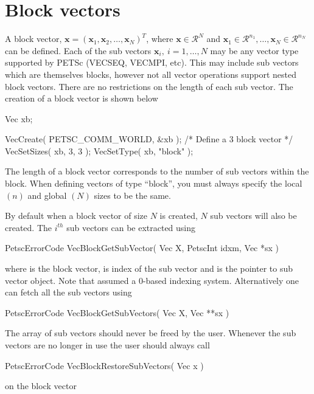 \documentclass[10pt,a4paper]{amsart}
\renewcommand{\v}[1]{\boldsymbol{#1}}		%
\newcommand{\code}[1]{{\fontfamily{txtt}\selectfont {#1}}}
\begin{document}
\section{Block vectors}
	A block vector, $\v x = ( \v x_1, \v x_2, \dots, \v x_{N} )^T$, where $\v x \in \mathcal R^{N}$ and $\v x_1 \in \mathcal R^{n_1}, \dots , \v x_{N} \in \mathcal R^{n_N}$ can be defined. Each of the sub vectors $\v x_{i}, \medspace i=1,\dots, N$ may be any vector type supported by PETSc (VECSEQ, VECMPI, etc). This may include sub vectors which are themselves blocks, however not all vector operations support nested block vectors. There are no restrictions on the length of each sub vector. The creation of a block vector is shown below
\begin{verbatimtab}[4]
	Vec xb;
	
	VecCreate( PETSC_COMM_WORLD, &xb );
	/* Define a 3 block vector */
	VecSetSizes( xb, 3, 3 );
	VecSetType( xb, "block" );
\end{verbatimtab}
The length of a block vector corresponds to the number of sub vectors within the block.
When defining vectors of type ``block'', you must always specify the local $(n)$ and global $(N)$ sizes to be the same.  

By default when a block vector of size $N$ is created, $N$ sub vectors will also be created. The $i^{th}$ sub vectors can be extracted using
\begin{verbatimtab}[4]
	PetscErrorCode VecBlockGetSubVector( Vec X, PetscInt idxm, Vec *sx )
\end{verbatimtab}
where \code{X} is the block vector, \code{idxm} is index of the sub vector and \code{*sx} is the pointer to sub vector object. Note that \code{idxm} assumed a 0-based indexing system. Alternatively one can fetch all the sub vectors using 
\begin{verbatimtab}[4]
	PetscErrorCode VecBlockGetSubVectors( Vec X, Vec **sx )
\end{verbatimtab}
The array of sub vectors \code{*sx} should never be freed by the user. Whenever the sub vectors are no longer in use the user should always call 
\begin{verbatimtab}[4]
	PetscErrorCode VecBlockRestoreSubVectors( Vec x )
\end{verbatimtab}	
on the block vector	
	
\end{document}
